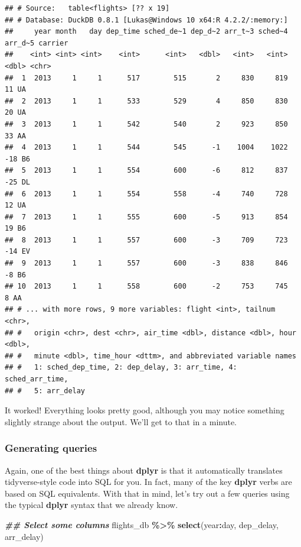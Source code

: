 \documentclass[
]{article}
\newenvironment{Shaded}{\begin{snugshade}}{\end{snugshade}}
\newcommand{\DocumentationTok}[1]{\textcolor[rgb]{0.56,0.35,0.01}{\textbf{\textit{#1}}}}
\newcommand{\FunctionTok}[1]{\textcolor[rgb]{0.13,0.29,0.53}{\textbf{#1}}}
\newcommand{\NormalTok}[1]{#1}
\newcommand{\SpecialCharTok}[1]{\textcolor[rgb]{0.81,0.36,0.00}{\textbf{#1}}}
\begin{document}
\begin{verbatim}
## # Source:   table<flights> [?? x 19]
## # Database: DuckDB 0.8.1 [Lukas@Windows 10 x64:R 4.2.2/:memory:]
##     year month   day dep_time sched_de~1 dep_d~2 arr_t~3 sched~4 arr_d~5 carrier
##    <int> <int> <int>    <int>      <int>   <dbl>   <int>   <int>   <dbl> <chr>  
##  1  2013     1     1      517        515       2     830     819      11 UA     
##  2  2013     1     1      533        529       4     850     830      20 UA     
##  3  2013     1     1      542        540       2     923     850      33 AA     
##  4  2013     1     1      544        545      -1    1004    1022     -18 B6     
##  5  2013     1     1      554        600      -6     812     837     -25 DL     
##  6  2013     1     1      554        558      -4     740     728      12 UA     
##  7  2013     1     1      555        600      -5     913     854      19 B6     
##  8  2013     1     1      557        600      -3     709     723     -14 EV     
##  9  2013     1     1      557        600      -3     838     846      -8 B6     
## 10  2013     1     1      558        600      -2     753     745       8 AA     
## # ... with more rows, 9 more variables: flight <int>, tailnum <chr>,
## #   origin <chr>, dest <chr>, air_time <dbl>, distance <dbl>, hour <dbl>,
## #   minute <dbl>, time_hour <dttm>, and abbreviated variable names
## #   1: sched_dep_time, 2: dep_delay, 3: arr_time, 4: sched_arr_time,
## #   5: arr_delay
\end{verbatim}

It worked! Everything looks pretty good, although you may notice
something slightly strange about the output. We'll get to that in a
minute.

\hypertarget{generating-queries}{%
\subsubsection{Generating queries}\label{generating-queries}}

Again, one of the best things about \textbf{dplyr} is that it
automatically translates tidyverse-style code into SQL for you. In fact,
many of the key \textbf{dplyr} verbs are based on SQL equivalents. With
that in mind, let's try out a few queries using the typical
\textbf{dplyr} syntax that we already know.

\begin{Shaded}
\begin{Highlighting}[]
\DocumentationTok{\#\# Select some columns}
\NormalTok{flights\_db }\SpecialCharTok{\%\textgreater{}\%} \FunctionTok{select}\NormalTok{(year}\SpecialCharTok{:}\NormalTok{day, dep\_delay, arr\_delay)}
\end{Highlighting}
\end{Shaded}
\end{document}
